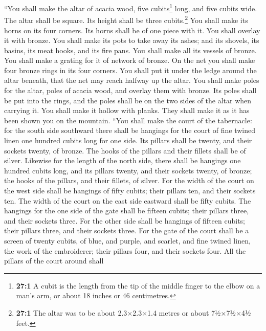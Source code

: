  ``You shall make the altar of acacia wood, five
cubits\footnote{\textbf{27:1} A cubit is the length from the tip of the
  middle finger to the elbow on a man's arm, or about 18 inches or 46
  centimetres.} long, and five cubits wide. The altar shall be square.
Its height shall be three cubits.\footnote{\textbf{27:1} The altar was
  to be about 2.3×2.3×1.4 metres or about 7½×7½×4½ feet.} 
You shall make its horns on its four corners. Its horns shall be of one
piece with it. You shall overlay it with bronze.  You
shall make its pots to take away its ashes; and its shovels, its basins,
its meat hooks, and its fire pans. You shall make all its vessels of
bronze.  You shall make a grating for it of network of
bronze. On the net you shall make four bronze rings in its four corners.
 You shall put it under the ledge around the altar
beneath, that the net may reach halfway up the altar.  You
shall make poles for the altar, poles of acacia wood, and overlay them
with bronze.  Its poles shall be put into the rings, and
the poles shall be on the two sides of the altar when carrying it.
 You shall make it hollow with planks. They shall make it
as it has been shown you on the mountain.  ``You shall
make the court of the tabernacle: for the south side southward there
shall be hangings for the court of fine twined linen one hundred cubits
long for one side.  Its pillars shall be twenty, and
their sockets twenty, of bronze. The hooks of the pillars and their
fillets shall be of silver.  Likewise for the length of
the north side, there shall be hangings one hundred cubits long, and its
pillars twenty, and their sockets twenty, of bronze; the hooks of the
pillars, and their fillets, of silver.  For the width of
the court on the west side shall be hangings of fifty cubits; their
pillars ten, and their sockets ten.  The width of the
court on the east side eastward shall be fifty cubits. 
The hangings for the one side of the gate shall be fifteen cubits; their
pillars three, and their sockets three.  For the other
side shall be hangings of fifteen cubits; their pillars three, and their
sockets three.  For the gate of the court shall be a
screen of twenty cubits, of blue, and purple, and scarlet, and fine
twined linen, the work of the embroiderer; their pillars four, and their
sockets four.  All the pillars of the court around shall
